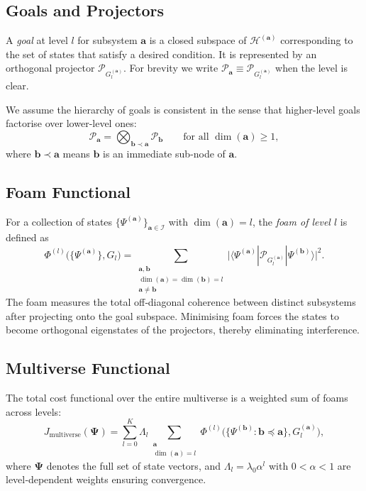 \documentclass[11pt]{article}
\newcommand{\cP}{\mathcal{P}}
\newcommand{\cH}{\mathcal{H}}
\newcommand{\cI}{\mathcal{I}}
\begin{document}
\subsection{Goals and Projectors}
A \emph{goal} at level $l$ for subsystem $\mathbf{a}$ is a closed subspace of $\cH^{(\mathbf{a})}$ corresponding to the set of states that satisfy a desired condition. It is represented by an orthogonal projector $\cP_{G_l^{(\mathbf{a})}}$. For brevity we write $\cP_{\mathbf{a}} \equiv \cP_{G_l^{(\mathbf{a})}}$ when the level is clear.

We assume the hierarchy of goals is consistent in the sense that higher‑level goals factorise over lower‑level ones:
\begin{equation}
\cP_{\mathbf{a}} = \bigotimes_{\mathbf{b} \prec \mathbf{a}} \cP_{\mathbf{b}} \qquad \text{for all } \dim(\mathbf{a}) \ge 1,
\label{eq:factorisation}
\end{equation}
where $\mathbf{b} \prec \mathbf{a}$ means $\mathbf{b}$ is an immediate sub‑node of $\mathbf{a}$.

\subsection{Foam Functional}
For a collection of states $\{\Psi^{(\mathbf{a})}\}_{\mathbf{a} \in \cI}$ with $\dim(\mathbf{a})=l$, the \emph{foam of level $l$} is defined as
\begin{equation}
\Phi^{(l)}\bigl(\{\Psi^{(\mathbf{a})}\}, G_l\bigr) = 
\sum_{\substack{\mathbf{a},\mathbf{b} \\ \dim(\mathbf{a})=\dim(\mathbf{b})=l \\ \mathbf{a}\neq \mathbf{b}}}
\bigl| \langle \Psi^{(\mathbf{a})} | \cP_{G_l^{(\mathbf{a})}} | \Psi^{(\mathbf{b})} \rangle \bigr|^2.
\label{eq:foam_def}
\end{equation}
The foam measures the total off‑diagonal coherence between distinct subsystems after projecting onto the goal subspace. Minimising foam forces the states to become orthogonal eigenstates of the projectors, thereby eliminating interference.

\subsection{Multiverse Functional}
The total cost functional over the entire multiverse is a weighted sum of foams across levels:
\begin{equation}
J_{\text{multiverse}}(\mathbf{\Psi}) = \sum_{l=0}^{K} \Lambda_l \sum_{\substack{\mathbf{a} \\ \dim(\mathbf{a})=l}} \Phi^{(l)}\bigl(\{\Psi^{(\mathbf{b})} : \mathbf{b} \preceq \mathbf{a}\}, G_l^{(\mathbf{a})}\bigr),
\label{eq:J_total}
\end{equation}
where $\mathbf{\Psi}$ denotes the full set of state vectors, and $\Lambda_l = \lambda_0 \alpha^l$ with $0 < \alpha < 1$ are level‑dependent weights ensuring convergence.
\end{document}
